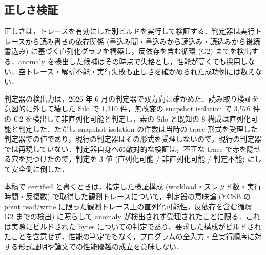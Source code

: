 \documentclass[submit,techrep,noauthor]{ipsj}
\begin{document}
\subsection{正しさ検証}
\label{sec:design-verify}

正しさは，トレースを有効にした別ビルドを実行して検証する．判定器は実行トレースから読み書きの依存関係 (書込み間・書込みから読込み・読込みから後続書込み) に基づく直列化グラフを構築し，反依存を含む循環 (G2) までを検出する．anomaly を検出した候補はその時点で失格とし，性能が高くても採用しない．空トレース・解析不能・実行失敗も正しさを確かめられた成功例には数えない．

判定器の検出力は，2026 年 6 月の判定器で双方向に確かめた．読み取り検証を意図的に外して壊した Silo で 1,310 件，無改変の snapshot isolation で 3,576 件の G2 を検出して非直列化可能と判定し，素の Silo と既知の 8 構成は直列化可能と判定した．ただし snapshot isolation の件数は当時の trace 形式を受理した判定器での値であり，現行の判定器はその形式を受理しないので，現行の判定器では再現していない．判定器自身への敵対的な検証は，不正な trace で赤を隠せる穴を見つけたので，判定を 3 値 (直列化可能 / 非直列化可能 / 判定不能) にして安全側に倒した．

本稿で certified と書くときは，指定した検証構成 (workload・スレッド数・実行時間・反復数) で取得した観測トレースについて，判定器の意味論 (YCSB の point read/write に限った観測トレース上の直列化可能性，反依存を含む循環 G2 までの検出) に照らして anomaly が検出されず受理されたことに限る．これは実際にビルドされた bytes についての判定であり，要求した構成がビルドされたことを含意せず，性能の判定でもなく，プログラムの全入力・全実行順序に対する形式証明や論文での性能優越の成立を意味しない．
\end{document}
